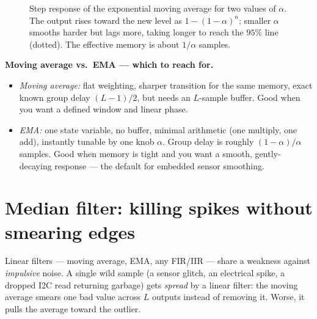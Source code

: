 \begin{figure}[H]
\centering
{}
\caption{Step response of the exponential moving average for two values of
$\alpha$. The output rises toward the new level as $1-(1-\alpha)^n$; smaller
$\alpha$ smooths harder but lags more, taking longer to reach the $95\%$ line
(dotted). The effective memory is about $1/\alpha$ samples.}
\label{ch17:fig-ema}
\end{figure}

\begin{focusbox}
\textbf{Moving average vs.\ EMA --- which to reach for.}
\begin{itemize}
  \item \emph{Moving average:} flat weighting, sharper transition for the same
        memory, exact known group delay $(L-1)/2$, but needs an $L$-sample
        buffer. Good when you want a defined window and linear phase.
  \item \emph{EMA:} one state variable, no buffer, minimal arithmetic (one multiply,
        one add), instantly tunable by one knob $\alpha$. Group delay is roughly $(1-\alpha)/\alpha$
        samples. Good when memory is tight and you want a smooth, gently-decaying
        response --- the default for embedded sensor smoothing.
\end{itemize}
\end{focusbox}

\section{Median filter: killing spikes without smearing edges}
\label{ch17:median}

Linear filters --- moving average, EMA, any FIR/IIR --- share a weakness
against \emph{impulsive} noise. A single wild sample (a sensor glitch, an
electrical spike, a dropped I2C read returning garbage) gets \emph{spread} by a
linear filter: the moving average smears one bad value across $L$ outputs instead
of removing it. Worse, it pulls the average toward the outlier.


